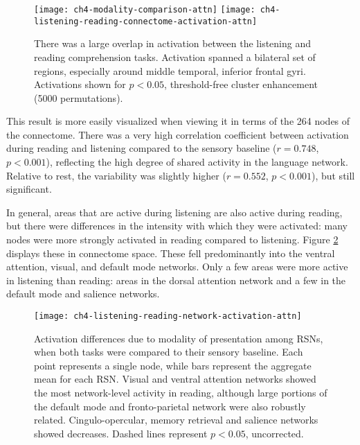 \begin{figure}[t!]
	\centering
	\texttt{[image: ch4-modality-comparison-attn]}
	\texttt{[image: ch4-listening-reading-connectome-activation-attn]}
    \caption[Large overlap between listening and reading activation]{There was a large overlap in activation between the listening and reading comprehension tasks. Activation spanned a bilateral set of regions, especially around middle temporal, inferior frontal gyri. Activations shown for $p < 0.05$, threshold-free cluster enhancement (5000 permutations).}
	\label{fig:ch4-modality-comparison-attn}
\end{figure}

This result is more easily visualized when viewing it in terms of the 264 nodes of the connectome. There was a very high correlation coefficient between activation during reading and listening compared to the sensory baseline ($r = 0.748$, $p < 0.001$), reflecting the high degree of shared activity in the language network. Relative to rest, the variability was slightly higher ($r = 0.552$, $p < 0.001$), but still significant. 

In general, areas that are active during listening are also active during reading, but there were differences in the intensity with which they were activated: many nodes were more strongly activated in reading compared to listening. Figure \ref{fig:ch4-listening-reading-network-activation-attn} displays these in connectome space. These fell predominantly into the ventral attention, visual, and default mode networks. Only a few areas were more active in listening than reading: areas in the dorsal attention network and a few in the default mode and salience networks. 

\begin{figure}[t]
	\centering
	\texttt{[image: ch4-listening-reading-network-activation-attn]}
    \caption[Activation differences due to modality of presentation among RSNs]{Activation differences due to modality of presentation among RSNs, when both tasks were compared to their sensory baseline. Each point represents a single node, while bars represent the aggregate mean for each RSN. Visual and ventral attention networks showed the most network-level activity in reading, although large portions of the default mode and fronto-parietal network were also robustly related. Cingulo-opercular, memory retrieval and salience networks showed decreases. Dashed lines represent $p < 0.05$, uncorrected.}
	\label{fig:ch4-listening-reading-network-activation-attn}
\end{figure}

